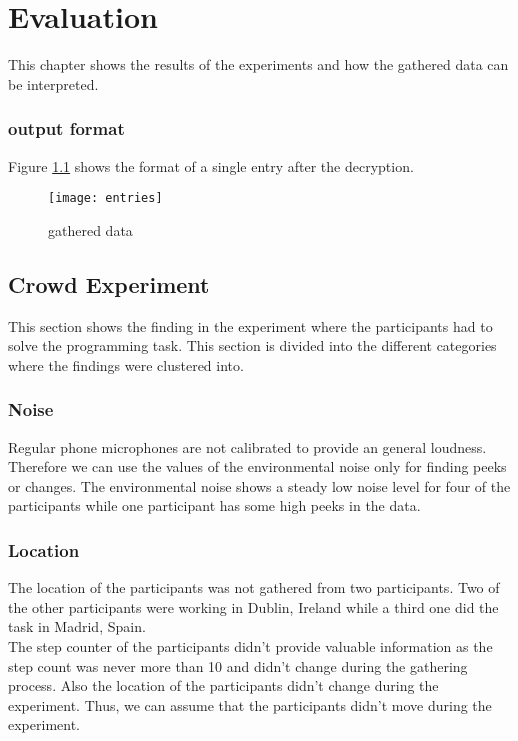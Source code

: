 \chapter{Evaluation}
This chapter shows the results of the experiments and how the gathered data can be interpreted. 

\subsection{output format}
Figure \ref{entries} shows the format of a single entry after the decryption. 

\begin{figure}[!htb]
\centering
\texttt{[image: entries]}
\caption{gathered data}\label{entries}
\vspace{10 mm}
\end{figure}

\FloatBarrier

\section{Crowd Experiment}
This section shows the finding in the experiment where the participants had to solve the programming task. This section is divided into the different categories where the findings were clustered into.

\subsection{Noise}
Regular phone microphones are not calibrated to provide an general loudness. Therefore we can use the values of the environmental noise only for finding peeks or changes.
The environmental noise shows a steady low noise level for four of the participants while one participant has some high peeks in the data. 

\subsection{Location}
The location of the participants was not gathered from two participants. Two of the other participants were working in Dublin, Ireland while a third one did the task in Madrid, Spain.\\
The step counter of the participants didn't provide valuable information as the step count was never more than 10 and didn't change during the gathering process. Also the location of the participants didn't change during the experiment. Thus, we can assume that the participants didn't move during the experiment.

